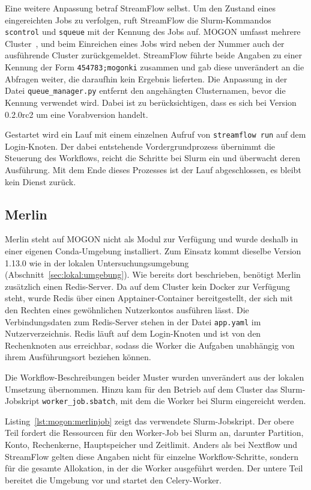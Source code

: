Eine weitere Anpassung betraf StreamFlow selbst. Um den Zustand
eines eingereichten Jobs zu verfolgen, ruft StreamFlow die
Slurm-Kommandos \texttt{scontrol} und \texttt{squeue} mit der
Kennung des Jobs auf. MOGON umfasst mehrere Cluster~\cite{mogondocs-what}, und beim
Einreichen eines Jobs wird neben der Nummer auch der ausführende
Cluster zurückgemeldet. StreamFlow führte
beide Angaben zu einer Kennung der Form \texttt{454783;mogonki}
zusammen und gab diese unverändert an die Abfragen weiter, die
daraufhin kein Ergebnis lieferten. Die Anpassung in der Datei
\texttt{queue\_manager.py} entfernt den angehängten Clusternamen,
bevor die Kennung verwendet wird. Dabei ist zu berücksichtigen,
dass es sich bei Version 0.2.0rc2 um eine Vorabversion handelt.

Gestartet wird ein Lauf mit einem einzelnen Aufruf von
\texttt{streamflow run} auf dem Login-Knoten. Der dabei entstehende
Vordergrundprozess übernimmt die Steuerung des Workflows, reicht die
Schritte bei Slurm ein und überwacht deren Ausführung. Mit dem Ende
dieses Prozesses ist der Lauf abgeschlossen, es bleibt kein Dienst
zurück.

\subsection{Merlin}
\label{sec:mogon:merlin}

Merlin steht auf MOGON nicht als Modul zur Verfügung und wurde
deshalb in einer eigenen Conda-Umgebung installiert. Zum Einsatz
kommt dieselbe Version 1.13.0 wie in der lokalen
Untersuchungsumgebung (Abschnitt~\ref{sec:lokal:umgebung}). Wie
bereits dort beschrieben, benötigt Merlin zusätzlich einen
Redis-Server. Da auf dem Cluster kein Docker zur Verfügung steht,
wurde Redis über einen Apptainer-Container bereitgestellt, der sich
mit den Rechten eines gewöhnlichen Nutzerkontos ausführen lässt.
Die Verbindungsdaten zum Redis-Server stehen in der Datei
\texttt{app.yaml} im Nutzerverzeichnis. Redis läuft auf dem
Login-Knoten und ist von den Rechenknoten aus erreichbar, sodass die
Worker die Aufgaben unabhängig von ihrem Ausführungsort beziehen
können.

Die Workflow-Beschreibungen beider Muster wurden unverändert aus der
lokalen Umsetzung übernommen. Hinzu kam für den Betrieb auf dem
Cluster das Slurm-Jobskript \texttt{worker\_job.sbatch}, mit dem die
Worker bei Slurm eingereicht werden.

Listing~\ref{lst:mogon:merlinjob} zeigt das verwendete
Slurm-Jobskript. Der obere Teil fordert die Ressourcen für den
Worker-Job bei Slurm an, darunter Partition, Konto,
Rechenkerne, Hauptspeicher und Zeitlimit. Anders als bei Nextflow
und StreamFlow gelten diese Angaben nicht für einzelne
Workflow-Schritte, sondern für die gesamte Allokation, in der die
Worker ausgeführt werden. Der untere Teil bereitet die Umgebung vor
und startet den Celery-Worker.

